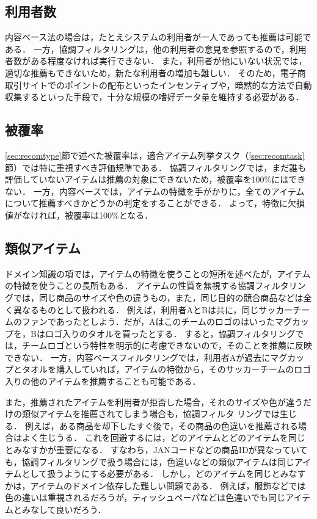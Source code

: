 \subsection{利用者数}

内容ベース法の場合は，たとえシステムの利用者が一人であっても推薦は可能である．
一方，協調フィルタリングは，他の利用者の意見を参照するので，利用者数がある程度なければ実行できない．
また，利用者が他にいない状況では，適切な推薦もできないため，新たな利用者の増加も難しい．
そのため，電子商取引サイトでのポイントの配布といったインセンティブや，暗黙的な方法で自動収集するといった手段で，十分な規模の嗜好データ量を維持する必要がある．

\subsection{被覆率}

\ref{sec:recomtype}節で述べた被覆率は，適合アイテム列挙タスク（\ref{sec:recomtask}節）では特に重視すべき評価規準である．
協調フィルタリングでは，まだ誰も評価していないアイテムは推薦の対象にできないため，被覆率を100\%にはできない．
一方，内容ベースでは，アイテムの特徴を手がかりに，全てのアイテムについて推薦すべきかどうかの判定をすることができる．
よって，特徴に欠損値がなければ，被覆率は100\%となる．

\subsection{類似アイテム}

ドメイン知識の項では，アイテムの特徴を使うことの短所を述べたが，アイテムの特徴を使うことの長所もある．
アイテムの性質を無視する協調フィルタリングでは，同じ商品のサイズや色の違うもの，また，同じ目的の競合商品などは全く異なるものとして扱われる．
例えば，利用者AとBは共に，同じサッカーチームのファンであったとしよう．だが，Aはこのチームのロゴのはいったマグカップを，Bはロゴ入りのタオルを買ったとする．
すると，協調フィルタリングでは，チームロゴという特性を明示的に考慮できないので，そのことを推薦に反映できない．
一方，内容ベースフィルタリングでは，利用者Aが過去にマグカップとタオルを購入していれば，アイテムの特徴から，そのサッカーチームのロゴ入りの他のアイテムを推薦することも可能である．

また，推薦されたアイテムを利用者が拒否した場合，それのサイズや色が違うだけの類似アイテムを推薦されてしまう場合も，協調フィルタ
リングでは生じる．
例えば，ある商品を却下したすぐ後で，その商品の色違いを推薦される場合はよく生じうる．
これを回避するには，どのアイテムとどのアイテムを同じとみなすかが重要になる．
すなわち，JANコードなどの商品IDが異なっていても，協調フィルタリングで扱う場合には，色違いなどの類似アイテムは同じアイテムとして扱うようにする必要がある．
しかし，どのアイテムを同じとみなすかは，アイテムのドメイン依存した難しい問題である．
例えば，服飾などでは色の違いは重視されるだろうが，ティッシュペーパなどは色違いでも同じアイテムとみなして良いだろう．

